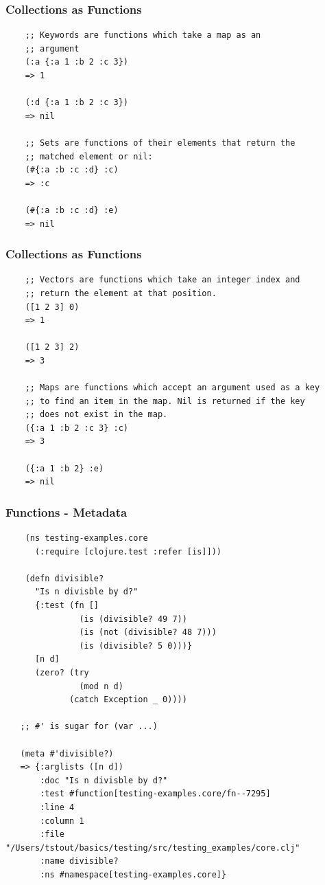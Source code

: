 \documentclass{beamer}
\renewcommand{\footnotesize}{\tiny}
\begin{document}
\begin{frame}[fragile]
  \frametitle{Collections as Functions}
  \begin{verbatim}
    ;; Keywords are functions which take a map as an
    ;; argument
    (:a {:a 1 :b 2 :c 3})
    => 1

    (:d {:a 1 :b 2 :c 3})
    => nil

    ;; Sets are functions of their elements that return the 
    ;; matched element or nil: 
    (#{:a :b :c :d} :c)
    => :c

    (#{:a :b :c :d} :e)
    => nil

  \end{verbatim}
\end{frame}

\begin{frame}[fragile]
  \frametitle{Collections as Functions}
  \begin{verbatim}
    ;; Vectors are functions which take an integer index and 
    ;; return the element at that position.
    ([1 2 3] 0)
    => 1

    ([1 2 3] 2)
    => 3

    ;; Maps are functions which accept an argument used as a key 
    ;; to find an item in the map. Nil is returned if the key
    ;; does not exist in the map.
    ({:a 1 :b 2 :c 3} :c)
    => 3

    ({:a 1 :b 2} :e)
    => nil

  \end{verbatim}
\end{frame}

\begin{frame}[fragile]
  \frametitle{Functions - Metadata}
  \begin{verbatim}
    (ns testing-examples.core
      (:require [clojure.test :refer [is]]))

    (defn divisible?
      "Is n divisble by d?"
      {:test (fn []
               (is (divisible? 49 7))
               (is (not (divisible? 48 7)))
               (is (divisible? 5 0)))}
      [n d]
      (zero? (try 
               (mod n d)
             (catch Exception _ 0))))
      
   ;; #' is sugar for (var ...)

   (meta #'divisible?)  
   => {:arglists ([n d])
       :doc "Is n divisble by d?"
       :test #function[testing-examples.core/fn--7295]
       :line 4
       :column 1
       :file "/Users/tstout/basics/testing/src/testing_examples/core.clj"
       :name divisible?
       :ns #namespace[testing-examples.core]}
  \end{verbatim}
\end{frame}
\end{document}
